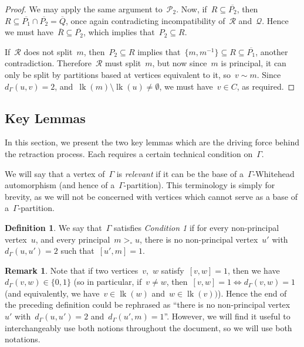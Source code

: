 \documentclass[11pt]{amsart}
\theoremstyle{definition}
\theoremstyle{definition}
\theoremstyle{definition}
\theoremstyle{definition}
\newtheorem{remark}[theorem]{Remark}
\newtheorem{definition}[theorem]{Definition}
\newcommand{\calQ}{\mathcal{Q}}
\newcommand{\calP}{\mathcal{P}} %
\newcommand{\calR}{\mathcal{R}} %
\newcommand{\link}[1]{\operatorname{lk}({#1})} %
\begin{document}
\begin{proof}
    We may apply the same argument to~$\calP_2$. Now, if~$R \subseteq \overline{P_2}$, then~$R \subseteq \overline{P_1} \cap \overline{P_2} = \overline{Q}$, once again contradicting incompatibility of~$\calR$ and~$\calQ$. Hence we must have~$\overline{R} \subseteq \overline{P_2}$, which implies that~$P_2 \subseteq R$. 
    
    If~$\calR$ does not split~$m$, then~$P_2 \subseteq R$ implies that~$\{m, m^{-1}\} \subseteq R \subseteq \overline{P_1}$, another contradiction. Therefore~$\calR$ must split~$m$, but now since~$m$ is principal, it can only be split by partitions based at vertices equivalent to it, so~$v \sim m$. Since~$d_\Gamma(u, v) = 2$, and~$\link{m} \setminus \link{u} \neq \emptyset$, we must have~$v \in C$, as required.
\end{proof}

\subsection{Key Lemmas}\label{subsec:key lemmas}

In this section, we present the two key lemmas which are the driving force behind the retraction process. Each requires a certain technical condition on~$\Gamma$. 

We will say that a vertex of~$\Gamma$ is \emph{relevant} if it can be the base of a~$\Gamma$-Whitehead automorphism (and hence of a~$\Gamma$-partition). This terminology is simply for brevity, as we will not be concerned with vertices which cannot serve as a base of a~$\Gamma$-partition.

\begin{definition}\label{def:condition 1 (NEW)}
    We say that~$\Gamma$ satisfies \emph{Condition 1} if for every non-principal vertex~$u$, and every principal~$m >_\circ u$, there is no non-principal vertex~$u'$ with~$d_\Gamma(u, u') = 2$ such that~$[u', m] = 1$.
\end{definition}

\begin{remark}
    Note that if two vertices~$v$,~$w$ satisfy~$[v, w] = 1$, then we have~$d_\Gamma(v, w) \in \{0, 1\}$ (so in particular, if~$v \neq w$, then~$[v, w] = 1 \iff d_\Gamma(v, w) = 1$ (and equivalently, we have~$v \in \link{w}$ and~$w \in \link{v})$). Hence the end of the preceding definition could be rephrased as ``there is no non-principal vertex~$u'$ with~$d_\Gamma(u, u') = 2$ and~$d_\Gamma(u', m) = 1$''. However, we will find it useful to interchangeably use both notions throughout the document, so we will use both notations. 
\end{remark}
\end{document}
